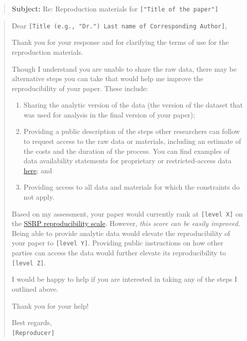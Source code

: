 \documentclass[
]{book}
\providecommand{\tightlist}{%
  \setlength{\itemsep}{0pt}\setlength{\parskip}{0pt}}
\begin{document}
\begin{quote}
\textbf{Subject:} Re: Reproduction materials for \texttt{{[}"Title\ of\ the\ paper"{]}}
\end{quote}

\begin{quote}
Dear \texttt{{[}Title\ (e.g.,\ "Dr.")\ Last\ name\ of\ Corresponding\ Author{]}},

Thank you for your response and for clarifying the terms of use for the reproduction materials.

Though I understand you are unable to share the raw data, there may be alternative steps you can take that would help me improve the reproducibility of your paper. These include:

\begin{enumerate}
\def\labelenumi{\arabic{enumi}.}
\tightlist
\item
  Sharing the analytic version of the data (the version of the dataset that was used for analysis in the final version of your paper);\\
\item
  Providing a public description of the steps other researchers can follow to request access to the raw data or materials, including an estimate of the costs and the duration of the process. You can find examples of data availability statements for proprietary or restricted-access data \href{https://social-science-data-editors.github.io/guidance/Requested_information_dcas.html}{here}; and\\
\item
  Providing access to all data and materials for which the constraints do not apply.
\end{enumerate}

Based on my assessment, your paper would currently rank at \texttt{{[}level\ X{]}} on the \href{https://bitss.github.io/ACRE/assessment.html\#levels-of-computational-reproducibility-for-a-specific-output}{SSRP reproducibility scale}. However, \emph{this score can be easily improved}. Being able to provide analytic data would elevate the reproducibility of your paper to \texttt{{[}level\ Y{]}}. Providing public instructions on how other parties can access the data would further elevate its reproducibility to \texttt{{[}level\ Z{]}}.

I would be happy to help if you are interested in taking any of the steps I outlined above.

Thank you for your help!

Best regards,\\
\texttt{{[}Reproducer{]}}
\end{quote}
\end{document}
